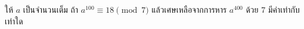﻿%
\question ให้ $a$ เป็นจำนวนเต็ม ถ้า $a^{100} \equiv 18 \pmod{7}$ แล้วเศษเหลือจากการหาร $a^{400}$ ด้วย 7 มีค่าเท่ากับเท่าใด
\newline
{}
